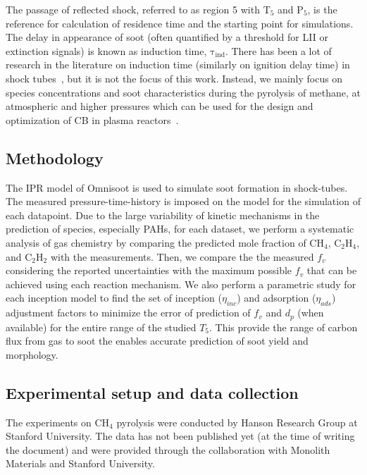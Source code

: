 The passage of reflected shock, referred to as region 5 with $\mathrm{T_5}$ and $\mathrm{P_5}$, is the reference for calculation of residence time and the starting point for simulations. The delay in appearance of soot (often quantified by a threshold for LII or extinction signals) is known as induction time, $\mathrm{\tau_{ind}}$. There has been a lot of research in the literature on induction time (similarly on ignition delay time) in shock tubes~\citep{fussey1978shock}, but it is not the focus of this work. Instead, we mainly focus on species concentrations and soot characteristics during the pyrolysis of methane, at atmospheric and higher pressures which can be used for the design and optimization of CB in plasma reactors~\citep{fulcheri2023energy}.

\subsection{Methodology}
The IPR model of Omnisoot is used to simulate soot formation in shock-tubes. The measured pressure-time-history is imposed on the model for the simulation of each datapoint. Due to the large variability of kinetic mechanisms in the prediction of species, especially PAHs, for each dataset, we perform a systematic analysis of gas chemistry by comparing the predicted mole fraction of $\mathrm{CH_4}$, $\mathrm{C_2H_4}$, and $\mathrm{C_2H_2}$ with the measurements. Then, we compare the the measured $f_v$ considering the reported uncertainties with the maximum possible $f_v$ that can be achieved using each reaction mechanism. We also perform a parametric study for each inception model to find the set of inception ($\eta_{inc}$) and adsorption ($\eta_{ads}$) adjustment factors to minimize the error of prediction of $f_v$ and $d_p$ (when available) for the entire range of the studied $T_5$. This provide the range of carbon flux from gas to soot the enables accurate prediction of soot yield and morphology.

%
%

\subsection{Experimental setup and data collection}
\label{sec:shockexpsetup}

The experiments on $\mathrm{CH_4}$ pyrolysis were conducted by Hanson Research Group at Stanford University. The data has not been published yet (at the time of writing the document) and were provided through the collaboration with Monolith Materials and Stanford University.

